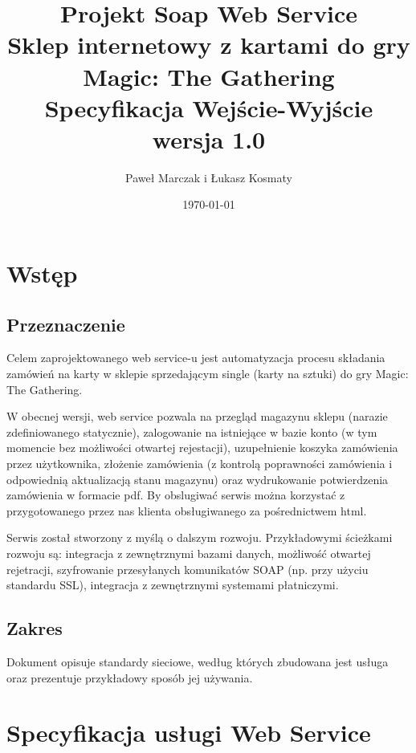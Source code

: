 \documentclass[11pt]{article}   %
\begin{document}
	\begin{titlepage}
	\title{%
		Projekt Soap Web Service\\
		\large Sklep internetowy z kartami do gry Magic: The Gathering\\
		Specyfikacja Wejście-Wyjście\\
	wersja 1.0}
	\author{Paweł Marczak i Łukasz Kosmaty}         %
	\date{\today}    %
	\maketitle
	\end{titlepage}
	\tableofcontents
	\section{Wstęp}     %
	\subsection{Przeznaczenie}
	Celem zaprojektowanego web service-u jest automatyzacja procesu składania zamówień na karty w sklepie sprzedającym single (karty na sztuki) do gry Magic: The Gathering.\par W obecnej wersji, web service pozwala na przegląd magazynu sklepu (narazie zdefiniowanego statycznie), zalogowanie na istniejące w bazie konto (w tym momencie bez możliwości otwartej rejestacji), uzupełnienie koszyka zamówienia przez użytkownika, złożenie zamówienia (z kontrolą poprawności zamówienia i odpowiednią aktualizacją stanu magazynu) oraz wydrukowanie potwierdzenia zamówienia w formacie pdf. By obslugiwać serwis można korzystać z przygotowanego przez nas klienta obsługiwanego za pośrednictwem html.\par Serwis został stworzony z myślą o dalszym rozwoju. Przykładowymi ścieżkami rozwoju są: integracja z zewnętrznymi bazami danych, możliwość otwartej rejetracji, szyfrowanie przesyłanych komunikatów SOAP (np. przy użyciu standardu SSL), integracja z zewnętrznymi systemami płatniczymi.
	\subsection{Zakres}
Dokument opisuje standardy sieciowe, według których zbudowana jest usługa oraz
prezentuje przykładowy sposób jej używania.
\section{Specyfikacja usługi Web Service}

	
\end{document}

